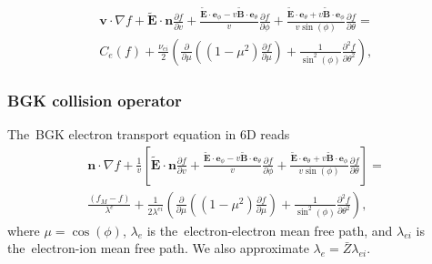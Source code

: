 \documentclass[review]{elsarticle}
\newcommand{\pdv}[2]{\frac{\partial{#1}}{\partial{#2}}}
\newcommand{\vect}[1]{\boldsymbol{#1}}
\newcommand{\mfp}{\lambda}
\newcommand{\mfpe}{\lambda_e}
\newcommand{\mfpei}{\lambda_{ei}}
\newcommand{\Zbar}{\bar{Z}}
\newcommand{\vmag}{v}
\newcommand{\vn}{\vect{n}}
\newcommand{\tE}{\vect{\tilde{E}}}
\newcommand{\tB}{\vect{\tilde{B}}}
\newcommand{\fM}{f_M}
\begin{document}
\begin{multline}
  \vect{v}\cdot\nabla f + \tE\cdot\vn \pdv{f}{\vmag} 
  + \frac{\tE\cdot\vect{e}_\phi 
  - \vmag\tB\cdot\vect{e}_\theta}{\vmag}\pdv{f}{\phi}
  + \frac{\tE\cdot\vect{e}_\theta + \vmag\tB\cdot\vect{e}_\phi}
  {\vmag\sin(\phi)}\pdv{f}{\theta} 
  =\\
  C_e(f) 
  + \frac{\nu_{ei}}{2} 
  \left(\pdv{}{\mu}\left((1 - \mu^2)\pdv{f}{\mu}\right)
  + \frac{1}{\sin^2(\phi)}\frac{\partial^2f}{\partial\theta^2} \right) ,
  \label{eq:Lorentz_spherical}
\end{multline}

\subsubsection{BGK collision operator}
The~BGK electron transport equation in 6D reads
\begin{multline}
  \vn\cdot\nabla f + \frac{1}{\vmag} \left[ \tE\cdot\vn \pdv{f}{\vmag} 
  + \frac{\tE\cdot\vect{e}_\phi 
  - \vmag\tB\cdot\vect{e}_\theta}{\vmag}\pdv{f}{\phi}
  + \frac{\tE\cdot\vect{e}_\theta + \vmag\tB\cdot\vect{e}_\phi}
  {\vmag\sin(\phi)}\pdv{f}{\theta} \right] 
  =\\
  \frac{\left(\fM - f\right)}{\lambda^e} 
  + \frac{1}{2 \lambda^{ei}} 
  \left(\pdv{}{\mu}\left((1 - \mu^2)\pdv{f}{\mu}\right)
  + \frac{1}{\sin^2(\phi)}\frac{\partial^2f}{\partial\theta^2} \right) ,
  \label{eq:BGK_spherical}
\end{multline}
where $\mu = \cos(\phi)$, $\mfpe$ is the~electron-electron mean free path, and
$\mfpei$ is the~electron-ion mean free path. We also approximate
$\mfpe = \Zbar \mfpei$.

\end{document}
